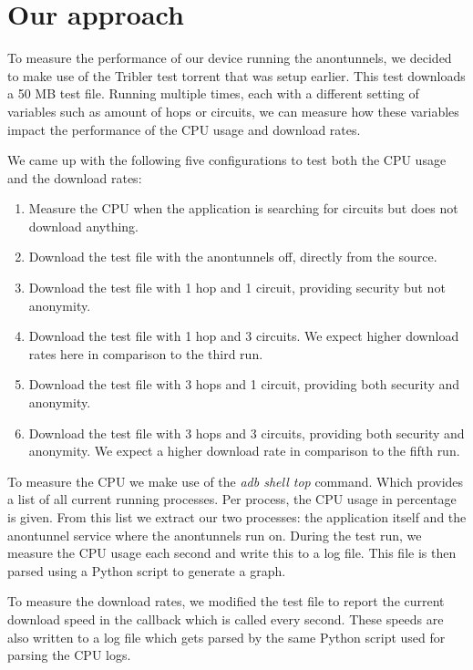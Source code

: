 \section{Our approach}
	\label{sec:approach}
	To measure the performance of our device running the anontunnels, we decided to make use of the Tribler test torrent that was setup earlier. This test downloads a 50 MB test file. Running multiple times, each with a different setting of variables such as amount of hops or circuits, we can measure how these variables impact the performance of the CPU usage and download rates.
	
	We came up with the following five configurations to test both the CPU usage and the download rates:
	
	\begin{enumerate}
		\item Measure the CPU when the application is searching for circuits but does not download anything.
		\item Download the test file with the anontunnels off, directly from the source.
		\item Download the test file with 1 hop and 1 circuit, providing security but not anonymity.
		\item Download the test file with 1 hop and 3 circuits. We expect higher download rates here in comparison to the third run.
		\item Download the test file with 3 hops and 1 circuit, providing both security and anonymity.
		\item Download the test file with 3 hops and 3 circuits, providing both security and anonymity. We expect a higher download rate in comparison to the fifth run.
	\end{enumerate}
	
	To measure the CPU we make use of the \emph{adb shell top} command. Which provides a list of all current running processes. Per process, the CPU usage in percentage is given. From this list we extract our two processes: the application itself  and the anontunnel service where the anontunnels run on. During the test run, we measure the CPU usage each second and write this to a log file. This file is then parsed using a Python script to generate a graph.
	
	To measure the download rates, we modified the test file to report the current download speed in the callback which is called every second. These speeds are also written to a log file which gets parsed by the same Python script used for parsing the CPU logs.